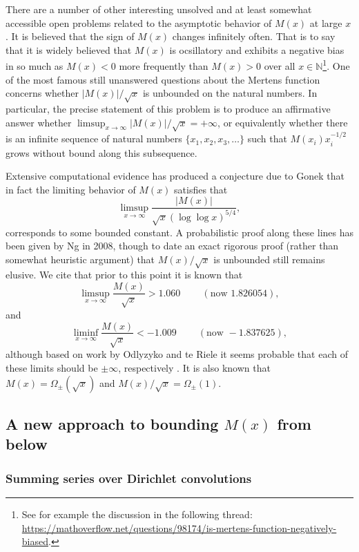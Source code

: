 \documentclass[11pt,reqno,a4letter]{article}
\numberwithin{figure}{section}
\numberwithin{table}{section}
\newcommand{\cf}{\textit{cf.\ }}
\theoremstyle{plain}
\numberwithin{theorem}{section}
\theoremstyle{definition}
\begin{document}
There are a number of other interesting unsolved and at 
least somewhat accessible open problems 
related to the asymptotic behavior of $M(x)$ at large $x$. 
It is believed that the sign of $M(x)$ changes infinitely often. 
That is to say that it is widely believed that $M(x)$ is 
ocsillatory and exhibits a negative bias in so much as 
$M(x) < 0$ more frequently than $M(x) > 0$ over all 
$x \in \mathbb{N}$\footnote{ 
     See for example the discussion in the following thread: \\ 
     \url{https://mathoverflow.net/questions/98174/is-mertens-function-negatively-biased}. 
}. 
One of the most famous still unanswered questions about the Mertens 
function concerns whether $|M(x)| / \sqrt{x}$ is unbounded on the 
natural numbers. In particular, the precise statement of this 
problem is to produce an affirmative answer whether 
$\limsup_{x \rightarrow \infty} |M(x)| / \sqrt{x} = +\infty$, or 
equivalently whether there is an infinite sequence of natural numbers 
$\{x_1, x_2, x_3, \ldots\}$ such that $M(x_i) x_i^{-1/2}$ grows without 
bound along this subsequence. 

Extensive computational evidence has produced 
a conjecture due to Gonek that in fact the limiting behavior of 
$M(x)$ satisfies 
that $$\limsup_{x \rightarrow \infty} \frac{|M(x)|}{\sqrt{x} 
(\log\log x)^{5/4}},$$ 
corresponds to some bounded constant. 
A probabilistic proof along these 
lines has been given by Ng in 2008, though to date an exact rigorous 
proof (rather than somewhat heuristic argument) that $M(x) / \sqrt{x}$ is 
unbounded still remains elusive. 
We cite that prior to this point it is known that \cite[\cf \S 4.1]{PRIMEREC} 
\[
\limsup_{x\rightarrow\infty} \frac{M(x)}{\sqrt{x}} > 1.060\ \qquad (\text{now } 1.826054), 
\] 
and 
\[ 
\liminf_{x\rightarrow\infty} \frac{M(x)}{\sqrt{x}} < -1.009\ \qquad (\text{now } -1.837625), 
\] 
although based on work by Odlyzyko and te Riele it seems probable that 
each of these limits should be $\pm \infty$, respectively 
\cite{ODLYZ-TRIELE,MREVISITED,ORDER-MERTENSFN,HURST-2017}. 
It is also known that $M(x) = \Omega_{\pm}(\sqrt{x})$ and 
$M(x) / \sqrt{x} = \Omega_{\pm}(1)$. 

\subsection{A new approach to bounding $M(x)$ from below} 

\subsubsection{Summing series over Dirichlet convolutions} 
\end{document}
